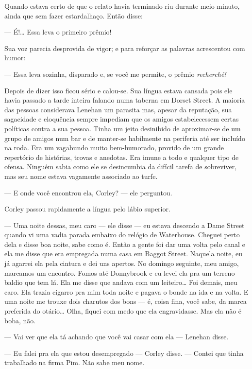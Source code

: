 Quando estava certo de que o relato havia terminado riu durante meio
minuto, ainda que sem fazer estardalhaço. Então disse:

--- É!\ldots{} Essa leva o primeiro prêmio!

Sua voz parecia desprovida de vigor; e para reforçar as palavras
acrescentou com humor:

--- Essa leva sozinha, disparado e, se você me permite, o prêmio
\textit{recherché!}

Depois de dizer isso ficou sério e calou-se. Sua língua estava cansada
pois ele havia passado a tarde inteira falando numa taberna em Dorset
Street. A maioria das pessoas considerava Lenehan um parasita mas,
apesar da reputação, sua sagacidade e eloquência sempre impediam que
os amigos estabelecessem certas políticas contra a sua pessoa. Tinha
um jeito desinibido de aproximar-se de um grupo de amigos num bar e de
manter-se habilmente na periferia até ser incluído na roda. Era um
vagabundo muito bem-humorado, provido de um grande repertório de
histórias, trovas e anedotas. Era imune a todo e qualquer tipo de
ofensa. Ninguém sabia como ele se desincumbia da difícil tarefa de
sobreviver, mas seu nome estava vagamente associado ao turfe.

--- E onde você encontrou ela, Corley? --- ele perguntou.

Corley passou rapidamente a língua pelo lábio superior.

--- Uma noite dessas, meu caro --- ele disse --- eu estava
descendo a Dame Street quando vi uma vadia parada embaixo do relógio
de Waterhouse. Cheguei perto dela e disse boa noite, sabe como é.
Então a gente foi dar uma volta pelo canal e ela me disse que era
empregada numa casa em Baggot Street. Naquela noite, eu já agarrei ela
pela cintura e dei uns apertos. No domingo seguinte, meu amigo,
marcamos um encontro. Fomos até Donnybrook e eu levei ela pra um
terreno baldio que tem lá. Ela me disse que andava com um leiteiro\ldots{}
Foi demais, meu caro. Ela trazia cigarro pra mim toda noite e pagava o
bonde na ida e na volta. E
uma noite me trouxe dois charutos dos bons --- é, coisa fina, você
sabe, da marca preferida do otário\ldots{} Olha, fiquei com medo que ela
engravidasse. Mas ela não é boba, não.

--- Vai ver que ela tá achando que você vai casar com ela
--- Lenehan disse.

--- Eu falei pra ela que estou desempregado --- Corley disse. --- Contei
que tinha trabalhado na firma Pim. Não sabe meu nome.

